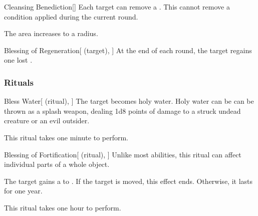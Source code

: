 \lowercase{\hypertarget{spell:Cleansing Benediction}{}}\label{spell:Cleansing Benediction}
\begin{freeability}[Rank 6]{\hypertarget{spell:Cleansing Benediction}{Cleansing Benediction}}[]
Each target can remove a .
This cannot remove a condition applied during the current round.

\rankline
{} The area increases to a \arealarge radius.
\end{freeability}
\vspace{0.25em}



\lowercase{\hypertarget{spell:Blessing of Regeneration}{}}\label{spell:Blessing of Regeneration}
\begin{attuneability}[Rank 7]{\hypertarget{spell:Blessing of Regeneration}{Blessing of Regeneration}}[ (target), ]
At the end of each round, the target regains one lost .
\end{attuneability}
\vspace{0.25em}



\subsubsection{Rituals}


\lowercase{\hypertarget{spell:Bless Water}{}}\label{spell:Bless Water}
\begin{attuneability}[Rank 1]{\hypertarget{spell:Bless Water}{Bless Water}}[ (ritual), ]
The target becomes holy water.
Holy water can be can be thrown as a splash weapon, dealing 1d8 points of damage to a struck undead creature or an evil outsider.

This ritual takes one minute to perform.
\end{attuneability}
\vspace{0.25em}



\lowercase{\hypertarget{spell:Blessing of Fortification}{}}\label{spell:Blessing of Fortification}
\begin{attuneability}[Rank 1]{\hypertarget{spell:Blessing of Fortification}{Blessing of Fortification}}[ (ritual), ]
Unlike most abilities, this ritual can affect individual parts of a whole object.

The target gains a   to .
If the target is moved, this effect ends.
Otherwise, it lasts for one year.

This ritual takes one hour to perform.
\end{attuneability}
\vspace{0.25em}




